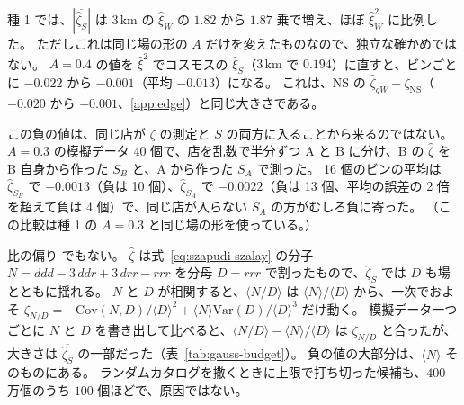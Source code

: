 \documentclass[a4paper,11pt]{ltjsarticle}
\begin{document}
種 1 では、$|\overline{\hat\zeta_S}|$ は $3\,\mathrm{km}$ の $\hat\xi_W$ の $1.82$ から $1.87$ 乗で増え、ほぼ $\hat\xi_W^2$ に比例した。
ただしこれは同じ場の形の $A$ だけを変えたものなので、独立な確かめではない。
$A = 0.4$ の値を $\hat\xi^2$ でコスモスの $\hat\xi_S$（$3\,\mathrm{km}$ で $0.194$）に直すと、ビンごとに $-0.022$ から $-0.001$（平均 $-0.013$）になる。
これは、NS の $\hat\zeta_{gW} - \zeta_{\mathrm{NS}}$（$-0.020$ から $-0.001$、\ref{app:edge}）と同じ大きさである。

\begin{table}[t]
  \centering
  \caption{$\zeta = 0$ のガウス場（幅 $10\,\mathrm{km}$、各 40 個）の $\hat\zeta_S$。
    種 1 の三つは場の形が同じで振幅 $A$ だけが違う。$f_{\mathrm{clip}}$ は $1 + \delta < 0$ を $0$ で切った点の割合。
    $\overline{\hat\zeta_S}$ は 16 個のビンの平均、「$< 0$」は平均が負のビン、「$< -2\,\mathrm{SE}$」は平均が平均の誤差の 2 倍を超えて負のビン。
    右端は、$\hat\zeta_W$ の平均が平均の誤差の 2 倍を超えるビン。}
  \label{tab:gauss-offset}
  \small
  
\end{table}

この負の値は、同じ店が $\zeta$ の測定と $S$ の両方に入ることから来るのではない。
$A = 0.3$ の模擬データ 40 個で、店を乱数で半分ずつ A と B に分け、B の $\hat\zeta$ を B 自身から作った $S_B$ と、A から作った $S_A$ で測った。
16 個のビンの平均は $\hat\zeta_{S_B}$ で $-0.0013$（負は 10 個）、$\hat\zeta_{S_A}$ で $-0.0022$（負は 13 個、平均の誤差の 2 倍を超えて負は 4 個）で、同じ店が入らない $S_A$ の方がむしろ負に寄った。
（この比較は種 1 の $A = 0.3$ と同じ場の形を使っている。）

比の偏り \cite{HuiGaztanaga1999} でもない。
$\hat\zeta$ は式~\eqref{eq:szapudi-szalay} の分子 $N = ddd - 3\,ddr + 3\,drr - rrr$ を分母 $D = rrr$ で割ったもので、$\hat\zeta_S$ では $D$ も場とともに揺れる。
$N$ と $D$ が相関すると、$\langle N/D \rangle$ は $\langle N \rangle / \langle D \rangle$ から、一次でおよそ
$\zeta_{N/D} = -\mathrm{Cov}(N, D)/\langle D \rangle^2 + \langle N \rangle \mathrm{Var}(D)/\langle D \rangle^3$
だけ動く。
模擬データ一つごとに $N$ と $D$ を書き出して比べると、$\langle N/D \rangle - \langle N \rangle/\langle D \rangle$ は $\zeta_{N/D}$ と合ったが、大きさは $\overline{\hat\zeta_S}$ の一部だった（表~\ref{tab:gauss-budget}）。
負の値の大部分は、$\langle N \rangle$ そのものにある。
ランダムカタログを撒くときに上限で打ち切った候補も、$400$ 万個のうち $100$ 個ほどで、原因ではない。
\end{document}
